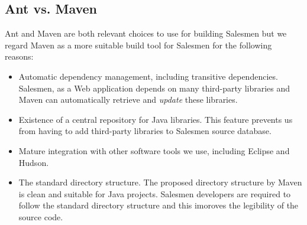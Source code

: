 \subsection{Ant vs. Maven}\label{BuildSystemToolsAntVSMaven}

Ant and Maven are both relevant choices to use for building Salesmen but
we regard Maven as a more suitable build tool for Salesmen for the 
following reasons:

\begin{itemize}
 \item Automatic dependency management, including transitive dependencies.
Salesmen, as a Web application depends on many third-party libraries and
Maven can automatically retrieve and \emph{update} these libraries.
 \item Existence of a central repository for Java libraries. This feature
prevents us from having to add third-party libraries to Salesmen
source database.
 \item Mature integration with other software tools we use, including
Eclipse and Hudson.
\item The standard directory structure. The proposed directory structure
by Maven is clean and suitable for Java projects. Salesmen developers are
required to follow the standard directory structure and this imoroves
the legibility of the source code.
\end{itemize}